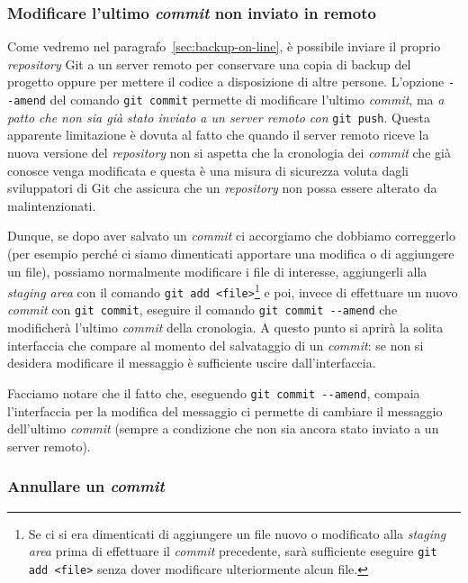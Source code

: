 \documentclass[a4paper,12pt,oneside]{article}
\begin{document}
\subsubsection{Modificare l'ultimo \emph{commit} non inviato in remoto}
\label{sec:modifica-ultimo-commit-non-remoto}

Come vedremo nel paragrafo~\ref{sec:backup-on-line}, è possibile inviare il
proprio \emph{repository} Git a un server remoto per conservare una copia di
backup del progetto oppure per mettere il codice a disposizione di altre
persone. L'opzione \lstinline|--amend| del comando \lstinline|git commit|
permette di modificare l'ultimo \emph{commit}, ma \emph{a patto che non sia già
  stato inviato a un server remoto con} \lstinline|git push|. Questa apparente
limitazione è dovuta al fatto che quando il server remoto riceve la nuova
versione del \emph{repository} non si aspetta che la cronologia dei
\emph{commit} che già conosce venga modificata e questa è una misura di
sicurezza voluta dagli sviluppatori di Git che assicura che un \emph{repository}
non possa essere alterato da malintenzionati.

Dunque, se dopo aver salvato un \emph{commit} ci accorgiamo che dobbiamo
correggerlo (per esempio perché ci siamo dimenticati apportare una modifica o di
aggiungere un file), possiamo normalmente modificare i file di interesse,
aggiungerli alla \emph{staging area} con il comando
\lstinline|git add <file>|\footnote{Se ci si era dimenticati di aggiungere un
  file nuovo o modificato alla \emph{staging area} prima di effettuare il
  \emph{commit} precedente, sarà sufficiente eseguire \lstinline|git add <file>|
  senza dover modificare ulteriormente alcun file.} e poi, invece di effettuare
un nuovo \emph{commit} con \lstinline|git commit|, eseguire il comando
\lstinline|git commit --amend| che modificherà l'ultimo \emph{commit} della
cronologia. A questo punto si aprirà la solita interfaccia che compare al
momento del salvataggio di un \emph{commit}: se non si desidera modificare il
messaggio è sufficiente uscire dall'interfaccia.

Facciamo notare che il fatto che, eseguendo \lstinline|git commit --amend|,
compaia l'interfaccia per la modifica del messaggio ci permette di cambiare il
messaggio dell'ultimo \emph{commit} (sempre a condizione che non sia ancora
stato inviato a un server remoto).

\subsubsection{Annullare un \emph{commit}}
\label{sec:annullare-commit}
\end{document}
